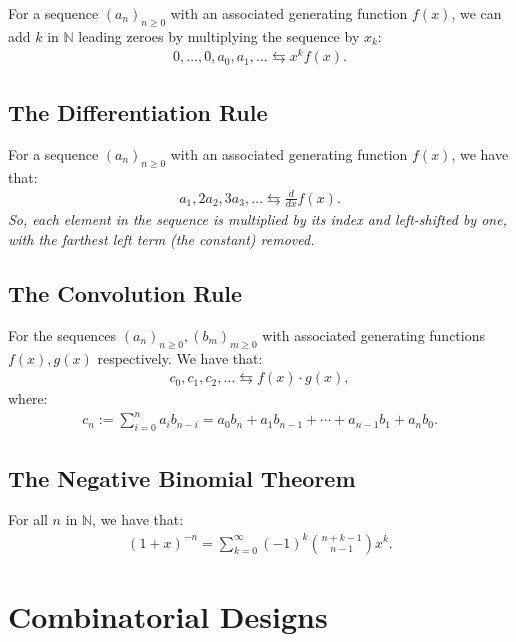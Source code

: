 \documentclass[a4paper, 12pt, twoside]{article}
\begin{document}
For a sequence $(a_n)_{n \geq 0}$ with an associated generating 
function $f(x)$, we can add $k$ in $\mathbb{N}$ leading zeroes by
multiplying the sequence by $x_k$: \begin{gather*}
  0, \ldots, 0, a_0, a_1, \ldots \leftrightarrows x^kf(x).
\end{gather*}

\subsection{The Differentiation Rule}

For a sequence $(a_n)_{n \geq 0}$ with an associated generating 
function $f(x)$, we have that: \begin{gather*}
  a_1, 2a_2, 3a_3, \ldots \leftrightarrows \frac{d}{dx}f(x).
\end{gather*} \textit{So, each element in the sequence
is multiplied by its index and left-shifted by one, with
the farthest left term (the constant) removed.}

\subsection{The Convolution Rule}

For the sequences $(a_n)_{n \geq 0}, (b_m)_{m \geq 0}$ with 
associated generating functions $f(x), g(x)$ respectively.
We have that: \begin{gather*}
  c_0, c_1, c_2, \ldots \leftrightarrows f(x) \cdot g(x),
\end{gather*} where: \begin{gather*}
  c_n := \sum_{i = 0}^{n} a_ib_{n - i} = a_0b_n + a_1b_{n-1} 
  + \cdots + a_{n-1}b_1 + a_nb_0.
\end{gather*}

\subsection{The Negative Binomial Theorem}

For all $n$ in $\mathbb{N}$, we have that: \begin{gather*}
  (1 + x)^{-n} = \sum_{k = 0}^\infty (-1)^k{n + k - 1 \choose n - 1}x^k.
\end{gather*}

\section{Combinatorial Designs}
\end{document}
